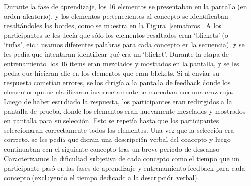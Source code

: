 Durante la fase de aprendizaje, los 16 elementos se presentaban en la pantalla (en orden aleatorio), y los elementos pertenecientes al concepto se identificaban resaltándoles los bordes, como se muestra en la Figura~\ref{semaforos}. A los participantes se les decía que sólo los elementos resaltados eran `blickets' (o `tufas', etc.: usamos diferentes palabras para cada concepto en la secuencia), y se les pedía que intentaran identificar qué era un `blicket'. Durante la etapa de entrenamiento, los 16 ítems eran mezclados y mostrados en la pantalla, y se les pedía que hicieran clic en los elementos que eran blickets. Si al enviar su respuesta cometían errores, se los dirigía a la pantalla de feedback donde los elementos que se clasificaron incorrectamente se marcaban con una cruz roja. Luego de haber estudiado la respuesta, los participantes eran redirigidos a la pantalla de prueba, donde los elementos eran nuevamente mezclados y mostrados en pantalla para su selección. Esto se repetía hasta que los participantes seleccionaran correctamente todos los elementos. Una vez que la selección era correcto, se les pedía que dieran una descripción verbal del concepto y luego continuaban con el siguiente concepto tras un breve período de descanso. Caracterizamos la dificultad subjetiva de cada concepto como el tiempo que un participante pasó en las fases de aprendizaje y entrenamiento-feedback para cada concepto (excluyendo el tiempo dedicado a la descripción verbal).

